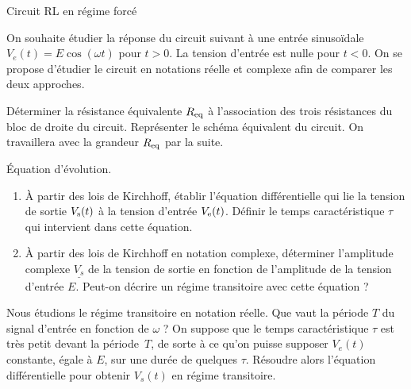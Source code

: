 \begin{exo}[MPSI]{Circuit RL en régime forcé}

On souhaite étudier la réponse du circuit suivant à une entrée sinusoïdale $V_e(t)=E\cos(\omega t)$ pour $t>0$. La tension d'entrée est nulle pour $t<0$. On se propose d'étudier le circuit en notations réelle et complexe afin de comparer les deux approches.

\begin{center}

\end{center}

\begin{quest}
\item Déterminer la résistance équivalente $R_{\rm eq}$ à l'association des trois résistances du bloc de droite du circuit. Représenter le schéma équivalent du circuit. On travaillera avec la grandeur $R_{\rm eq}$ par la suite.




\item  Équation d'évolution.


\begin{enumerate}[label=\alph{*})]

\item À partir des lois de Kirchhoff, établir l'équation différentielle qui lie la tension de sortie $V_{\rm s}(t)$ à la tension d'entrée $V_{\rm e}(t)$. Définir le temps caractéristique $\tau$ qui intervient dans cette équation.


\item À partir des lois de Kirchhoff en notation complexe, déterminer l'amplitude complexe $\underline{V_s}$ de la tension de sortie en fonction de l'amplitude de la tension d'entrée $E$. Peut-on décrire un régime transitoire avec cette équation ?

\end{enumerate}


\item Nous étudions le régime transitoire en notation réelle. Que vaut la période $T$ du signal d'entrée en fonction de $\omega$ ? On suppose que le temps caractéristique $\tau$ est très petit devant la période~$T$, de sorte à ce qu'on puisse supposer $V_e(t)$ constante, égale à $E$, sur une durée de quelques $\tau$. Résoudre alors l'équation différentielle pour obtenir $V_s(t)$ en régime transitoire.


\end{quest}
\end{exo}

